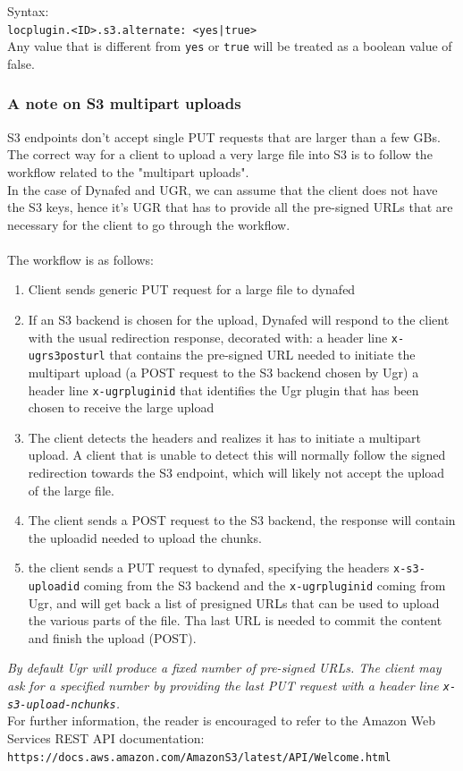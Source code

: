 \documentclass[12pt]{article} %
\begin{document}
Syntax:\\
\lstinline"locplugin.<ID>.s3.alternate: <yes|true>"\\
Any value that is different from \lstinline"yes" or \lstinline"true" will be treated as a boolean value of false.\\


\subsubsection{A note on S3 multipart uploads}
S3 endpoints don't accept single PUT requests that are larger than a few GBs. The correct way for a client to upload a very large file into S3 is to follow the workflow
related to the "multipart uploads".\\
In the case of Dynafed and UGR, we can assume that the client does not have the S3 keys, hence it's UGR that has to provide all the pre-signed URLs that
are necessary for the client to go through the workflow.\\
\\
The workflow is as follows:
\begin{enumerate}
 \item Client sends generic PUT request for a large file to dynafed
 \item If an S3 backend is chosen for the upload, Dynafed will respond to the client with the usual redirection response,
 decorated with:
 \subitem a header line  \lstinline"x-ugrs3posturl" that contains the pre-signed URL needed to initiate the multipart upload (a POST request to the S3
 backend chosen by Ugr)
 \subitem a header line \lstinline"x-ugrpluginid" that identifies the Ugr plugin that has been chosen to receive the large upload
 \item The client detects the headers and realizes it has to initiate a multipart upload. A client that is unable to detect this will normally
 follow the signed redirection towards the S3 endpoint, which will likely not accept the upload of the large file.
 \item The client sends a POST request to the S3 backend, the response will contain the uploadid needed
 to upload the chunks.
 \item the client sends a PUT request to dynafed, specifying the headers \lstinline"x-s3-uploadid" coming from the S3 backend and the \lstinline"x-ugrpluginid"
 coming from Ugr, and will get back a list of presigned URLs that can be used to upload the various parts
 of the file. Tha last URL is needed to commit the content and finish the upload (POST).
\end{enumerate}
\textit{By default Ugr will produce a fixed number of pre-signed URLs. The client may ask for a specified number by providing the last PUT
request with a header line \lstinline"x-s3-upload-nchunks".}\\
For further information, the reader is encouraged to refer to the Amazon Web Services REST API documentation:\\
\lstinline"https://docs.aws.amazon.com/AmazonS3/latest/API/Welcome.html"
\end{document}
